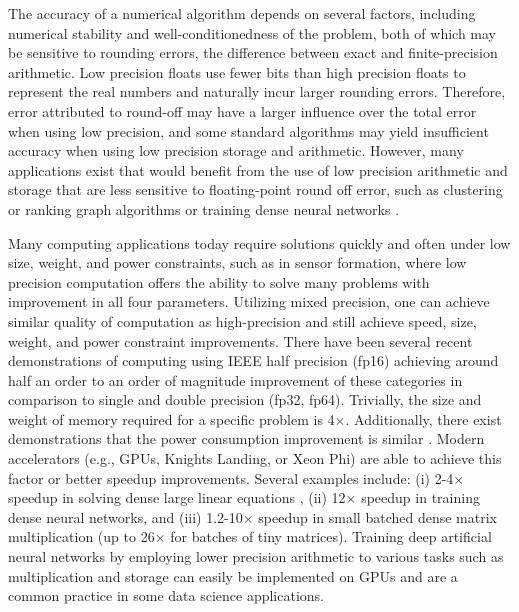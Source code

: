 The accuracy of a numerical algorithm depends on several factors, including numerical stability and well-conditionedness of the problem, both of which may be sensitive to rounding errors, the difference between exact and finite-precision arithmetic. 
Low precision floats use fewer bits than high precision floats to represent the real numbers and naturally incur larger rounding errors. 
Therefore, error attributed to round-off may have a larger influence over the total error when using low precision, and some standard algorithms may yield insufficient accuracy when using low precision storage and arithmetic.
However, many applications exist that would benefit from the use of low precision arithmetic and storage that are less sensitive to floating-point round off error, such as clustering or ranking graph algorithms \cite{vonLuxburg2007} or training dense neural networks \cite{micikevicius2018mixed}.\par

Many computing applications today require solutions quickly and often under low size, weight, and power constraints, such as in sensor formation, where
low precision computation offers the ability to solve many problems with improvement in all four parameters.
Utilizing mixed precision, one can achieve similar quality of computation as high-precision and still achieve 
speed, size, weight, and power constraint improvements. 
There have been several recent demonstrations of computing using IEEE half precision (fp16) achieving around half an order to an order of magnitude improvement of these categories in comparison to single and double precision (fp32, fp64).
Trivially, the size and weight of memory required for a specific problem is 4$\times$.
Additionally, there exist demonstrations that the power consumption improvement is similar
\cite{fagan2016powerwall}.
Modern accelerators (e.g., GPUs, Knights Landing, or Xeon Phi) are able to achieve this factor or better speedup improvements.
Several examples include:
(i)   2-4$\times$ speedup in solving dense large linear equations \cite{haidar2018iterative,haidar2019tensorcore},
(ii)  12$\times$ speedup in training dense neural networks,
and
(iii) 1.2-10$\times$ speedup in small batched dense matrix multiplication \cite{abdelfattah2019batched} (up to 26$\times$ for batches of tiny matrices).
Training deep artificial neural networks by employing lower precision arithmetic to various tasks such as multiplication \cite{Courbariaux2014Mult} and storage \cite{Courbariaux2014Storage} can easily be implemented on GPUs and are a common practice in some data science applications.\par

